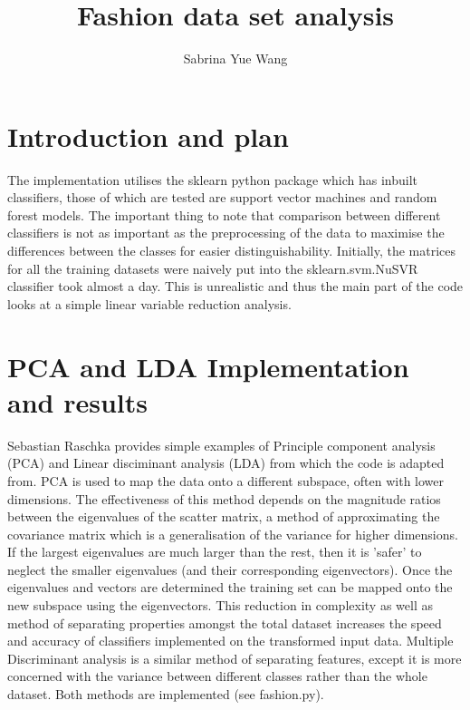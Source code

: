 \documentclass[11pt, oneside]{article}   	%
\title{Fashion data set analysis}
\author{Sabrina Yue Wang}
\begin{document}
\maketitle
\section{Introduction and plan}
The implementation utilises the sklearn python package which has inbuilt classifiers, those of which are tested are support vector machines and random forest models. The important thing to note that comparison between different classifiers is not as important as the preprocessing of the data to maximise the differences between the classes for easier distinguishability. Initially, the matrices for all the training datasets were naively  put into the sklearn.svm.NuSVR classifier took almost a day. This is unrealistic and thus the main part of the code looks at a simple linear variable reduction analysis.

\section{PCA and LDA Implementation and results}
Sebastian Raschka provides simple examples of Principle component analysis (PCA) \cite{PCA} and Linear disciminant analysis (LDA) \cite{LDA} from which the code is adapted from. PCA is used to map the data onto a different subspace, often with lower dimensions. The effectiveness of this method depends on the magnitude ratios between the eigenvalues of the scatter matrix, a method of approximating the covariance matrix which is a generalisation of the variance for higher dimensions. If the largest eigenvalues are much larger than the rest, then it is 'safer' to neglect the smaller eigenvalues (and their corresponding eigenvectors). Once the eigenvalues and vectors are determined the training set can be mapped onto the new subspace using the eigenvectors. This reduction in complexity as well as method of separating properties amongst the total dataset increases the speed and accuracy of classifiers implemented on the transformed input data. Multiple Discriminant analysis is a similar method of separating features, except it is more concerned with the variance between different classes rather than the whole dataset. Both methods are implemented (see fashion.py).
\end{document}
